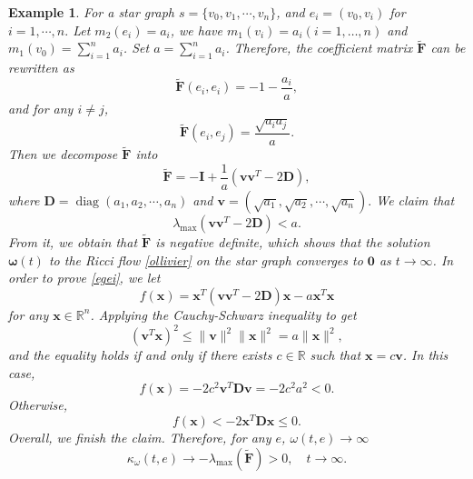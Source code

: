\documentclass{article}
\newtheorem{example}{Example}
\begin{document}
\begin{example}
For a star graph $s=\{v_0,v_1,\cdots,v_n\}$, and $e_i=(v_0,v_i)$ for $i=1,\cdots,n.$ Let $m_2(e_i)=a_i$, we have $m_1(v_i)=a_i(i=1,\dots, n)$ and $m_1(v_0)=\sum_{i=1}^na_i$. Set $a=\sum_{i=1}^na_i$. Therefore, the coefficient matrix $\mathbf{\tilde{F}}$ can be rewritten as 
\[\mathbf{\tilde{F}}(e_i,e_i)=-1-\frac{a_i}{a},\]
and for any $i\neq j$, 
\[\mathbf{\tilde{F}}(e_i,e_j)=\frac{\sqrt{a_ia_j}}{a}.\]
Then we decompose $\mathbf{\tilde{F}}$ into 
\[\mathbf{\tilde{F}}=-\mathbf{I}+\frac{1}{a}(\mathbf{v}\mathbf{v}^T-2\mathbf{D}),\]
where $\mathbf{D}=\operatorname{diag}(a_1,a_2,\cdots,a_n)$ and $\bm{v}=(\sqrt{a_1},\sqrt{a_2},\cdots,\sqrt{a_n}).$
We claim that 
\begin{equation}\label{egei}
\lambda_{\max}(\bm{v}\bm{v}^T-2\mathbf{D})<a.
\end{equation}
From it, we obtain that $\mathbf{\tilde{F}}$ is negative definite, which shows that the solution $\bm{\omega}(t)$ to the Ricci flow \eqref{ollivier} on the star graph converges to $\bm{0}$ as $t\rightarrow \infty$.
In order to prove \eqref{egei}, we let 
\[f(\bm{x})=\bm{x}^T(\bm{v}\bm{v}^T-2\mathbf{D})\bm{x}-a\bm{x}^T\bm{x}\]
for any $\bm{x}\in \mathbb{R}^n$. Applying the Cauchy-Schwarz inequality to get 
\[(\mathbf{v}^T\bm{x})^2\leq \|\mathbf{v}\|^2\|\bm{x}\|^2=a\|\bm{x}\|^2,\]
and the equality holds if and only if there exists $c\in \mathbb{R}$ such that $\bm{x}=c\bm{v}$. In this case, 
\[f(\bm{x})=-2c^2\bm{v}^T\mathbf{D}\bm{v}=-2c^2a^2<0.\]
Otherwise, 
\[f(\bm{x})<-2\bm{x}^T\mathbf{D}\bm{x}\leq0.\]
Overall, we finish the claim.
Therefore, for any $e$, $\omega(t,e)\rightarrow \infty$
\[\kappa_\omega(t,e)\rightarrow -\lambda_{\max}(\mathbf{\tilde{F}})>0, \quad t\rightarrow \infty.\]
\end{example}
\end{document}
